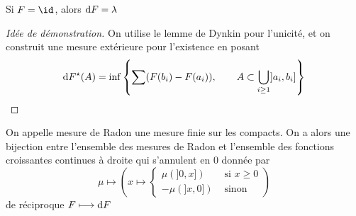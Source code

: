 \begin{ex}
Si $F=\id$, alors  $\mathop{}\!\mathrm d F=\lambda$
\end{ex}

\begin{proof}[Idée de démonstration]
On utilise le lemme de Dynkin pour l'unicité, et on construit une mesure extérieure pour l'existence en posant \[
    \mathop{}\!\mathrm d F^\star(A)=\inf \left\{ \sum (F(b_i)-F(a_i)), \qquad  A\subset \bigcup_{i\geq 1}]a_i, b_i] \right\} 
\] 
\end{proof}

\begin{defprop}
    On appelle mesure de Radon une mesure finie sur les compacts. On a alors une bijection entre l'ensemble des mesures de Radon et l'ensemble des fonctions croissantes continues à droite qui s'annulent en $0$ donnée par  \[
        \mu \longmapsto \left( x \longmapsto \begin{cases}
                \mu(]0,x]) & \text{ si } x\geq 0\\
                -\mu(]x, 0])&\text{ sinon }
        \end{cases}
         \right)
    \] 
    de réciproque $F \longmapsto \mathop{}\!\mathrm d F$
\end{defprop}
